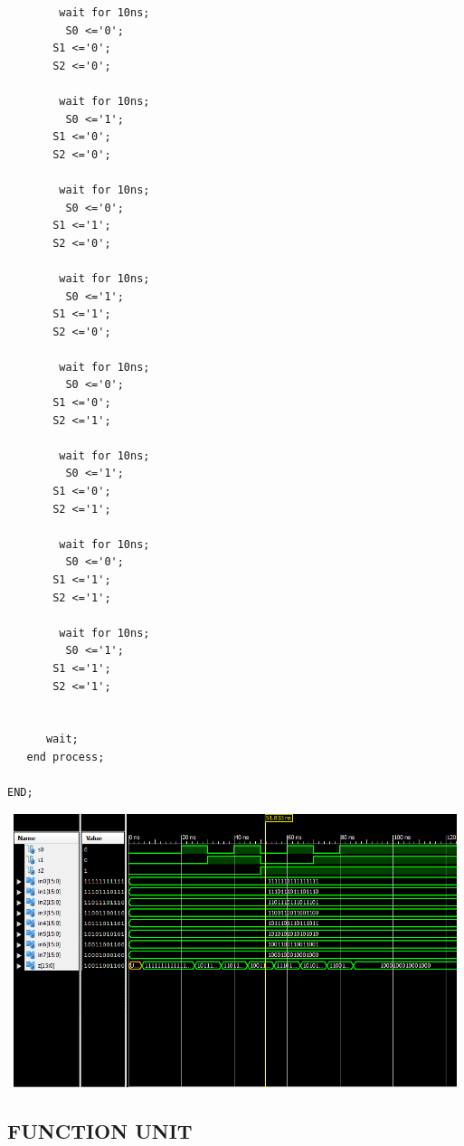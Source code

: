 \documentclass{article}
\begin{document}
\begin{lstlisting}
		wait for 10ns;
		 S0 <='0';
       S1 <='0';
       S2 <='0';
		 
		wait for 10ns;
		 S0 <='1';
       S1 <='0';
       S2 <='0';
		 
		wait for 10ns;
		 S0 <='0';
       S1 <='1';
       S2 <='0';
		 
		wait for 10ns;
		 S0 <='1';
       S1 <='1';
       S2 <='0';
		 
		wait for 10ns;
		 S0 <='0';
       S1 <='0';
       S2 <='1';
		 
		wait for 10ns;
		 S0 <='1';
       S1 <='0';
       S2 <='1';
		 
		wait for 10ns;
		 S0 <='0';
       S1 <='1';
       S2 <='1';
		 
		wait for 10ns;
		 S0 <='1';
       S1 <='1';
       S2 <='1';
		
		
      wait;
   end process;

END;
\end{lstlisting}
\includegraphics[width=16cm, height=8cm]{test_mux8.png}
\pagebreak


\subsection{FUNCTION UNIT}\label{sec:result}
\end{document}
